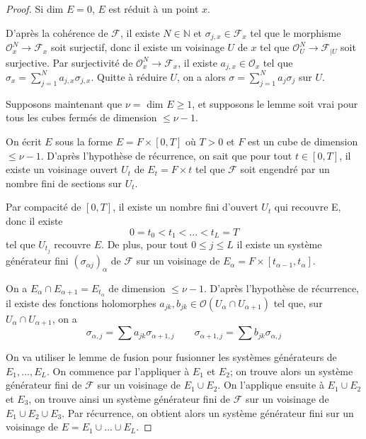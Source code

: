 \documentclass{article}
\theoremstyle{definition}
\theoremstyle{remarque}
\begin{document}
\begin{proof}
Si dim $E = 0$, $E$ est réduit à un point $x$.

D'après la cohérence de $\mathcal{F}$, il existe $N \in \mathbb{N}$ et $\sigma_{j,x} \in \mathcal{F}_x$ tel que le morphisme $\mathcal{O}^N_x \to \mathcal{F}_x$ soit surjectif, donc il existe un voisinage $U$ de $x$ tel que $\mathcal{O}^N_U \to \mathcal{F}_{|U}$ soit surjective.
Par surjectivité de $\mathcal{O}^N_x \to \mathcal{F}_x$, il existe $a_{j,x} \in \mathcal{O}_x$ tel que $\sigma_x = \sum_{j=1}^N a_{j,x}\sigma_{j,x}$. Quitte à réduire $U$, on a alors $\sigma = \sum_{j=1}^N a_j\sigma_j$ sur $U$.

Supposons maintenant que $\nu = $ dim $E \geq 1$, et supposons le lemme soit vrai pour tous les cubes fermés de dimension $\leq \nu - 1$.

On écrit $E$ sous la forme $E = F \times [0, T]$ où $T > 0$ et $F$ est un cube de dimension $\leq \nu - 1$. D'après l'hypothèse de récurrence, on sait que pour tout $t \in [0, T]$, il existe un voisinage ouvert $U_t$ de $E_t = F \times {t}$ tel que $\mathcal{F}$ soit engendré par un nombre fini de sections sur $U_t$.

Par compacité de $[0, T]$, il existe un nombre fini d'ouvert $U_t$ qui recouvre E, donc il existe $$0 = t_0 < t_1 < ... < t_L = T$$ tel que ${U_{t_j}}$ recouvre $E$. De plus, pour tout $0 \leq j \leq L$ il existe un système générateur fini $(\sigma_{\alpha j})_\alpha$ de $\mathcal{F}$ sur un voisinage de $E_\alpha = F \times [t_{\alpha - 1}, t_\alpha]$.

On a $E_\alpha \cap E_{\alpha+1} = E_{t_\alpha}$ de dimension $\leq \nu - 1$. D'après l'hypothèse de récurrence, il existe des fonctions holomorphes $a_{jk}, b_{jk} \in \mathcal{O}(U_\alpha \cap U_{\alpha +1})$ tel que, sur $U_\alpha \cap U_{\alpha +1}$, on a
\begin{equation*}
\sigma_{\alpha,j} = \sum a_{jk}\sigma_{\alpha+1,j} \qquad
\sigma_{\alpha+1,j} = \sum b_{jk}\sigma_{\alpha,j}
\end{equation*}

On va utiliser le lemme de fusion pour fusionner les systèmes générateurs de $E_1, ..., E_L$. On commence par l'appliquer à $E_1$ et $E_2$; on trouve alors un système générateur fini de $\mathcal{F}$ sur un voisinage de $E_1 \cup E_2$. On l'applique ensuite à $E_1 \cup E_2$ et $E_3$, on trouve ainsi un système générateur fini de $\mathcal{F}$ sur un voisinage de $E_1 \cup E_2 \cup E_3$. Par récurrence, on obtient alors un système générateur fini sur un voisinage de $E=E_1 \cup ... \cup E_L$.


\end{proof}
\end{document}
